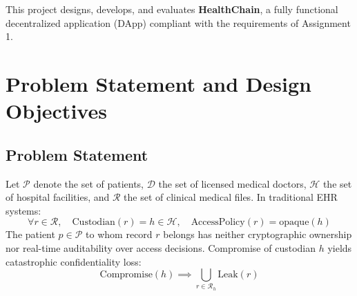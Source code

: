 \documentclass[11pt,a4paper]{article}
\begin{document}
This project designs, develops, and evaluates \textbf{HealthChain}, a fully functional decentralized application (DApp) compliant with the requirements of Assignment 1.

\section{Problem Statement and Design Objectives}

\subsection{Problem Statement}
Let $\mathcal{P}$ denote the set of patients, $\mathcal{D}$ the set of licensed medical doctors, $\mathcal{H}$ the set of hospital facilities, and $\mathcal{R}$ the set of clinical medical files. In traditional EHR systems:
\begin{equation}
    \forall r \in \mathcal{R}, \quad \text{Custodian}(r) = h \in \mathcal{H}, \quad \text{AccessPolicy}(r) = \text{opaque}(h)
\end{equation}
The patient $p \in \mathcal{P}$ to whom record $r$ belongs has neither cryptographic ownership nor real-time auditability over access decisions. Compromise of custodian $h$ yields catastrophic confidentiality loss:
\begin{equation}
    \text{Compromise}(h) \implies \bigcup_{r \in \mathcal{R}_h} \text{Leak}(r)
\end{equation}
\end{document}
